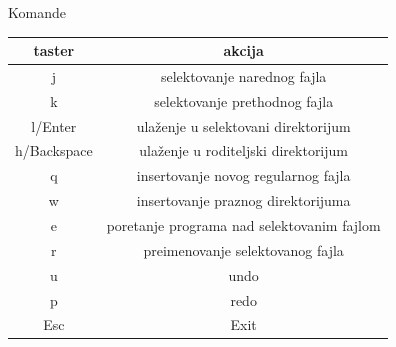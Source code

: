 \documentclass[12pt]{beamer}
\theoremstyle{definition}
\theoremstyle{remark}
\theoremstyle{plain}
\begin{document}
\begin{frame}{Komande}
\begin{tabular}{c | c}
  taster & akcija\\
  \hline
  j & selektovanje narednog fajla \\
  k & selektovanje prethodnog fajla \\
  l/Enter & ula\v zenje u selektovani direktorijum\\
  h/Backspace & ula\v zenje u roditeljski direktorijum\\
  q & insertovanje novog regularnog fajla\\
  w & insertovanje praznog direktorijuma\\
  e & poretanje programa nad selektovanim fajlom\\
  r & preimenovanje selektovanog fajla\\
  u & undo \\
  p & redo \\
  Esc & Exit
\end{tabular}
\end{frame}
\end{document}
